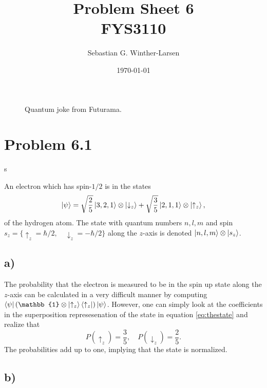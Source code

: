 \documentclass[]{article}
\title{Problem Sheet 6 \\
	\large{FYS3110}}
\author{Sebastian G. Winther-Larsen}
\date{\today}
\begin{document}
\maketitle


\begin{figure}[!htbp]
	\begin{minipage}[b]{0.5\textwidth}
	\end{minipage}
	\begin{minipage}[b]{0.5\textwidth}
	\end{minipage}
	\caption{Quantum joke from Futurama.}
\end{figure}

\section*{Problem 6.1}s

An electron which has spin-$1/2$ is in the states
\begin{equation}
\label{eq:thestate}
\ket{\psi} = \sqrt{\frac{2}{5}}\ket{3,2,1}\otimes\ket{\downarrow_z}+\sqrt{\frac{3}{5}}\ket{2,1,1}\otimes\ket{\uparrow_z},
\end{equation}
of the hydrogen atom. The state with quantum numbers $n,l,m$ and spin $s_z=\{\uparrow_z=\hbar/2, \quad \downarrow_z=-\hbar/2\}$ along the $z$-axis is denoted $\ket{n,l,m}\otimes\ket{s_z}$.

\subsection*{a)}
The probability that the electron is measured to be in the spin up state along the $z$-axis can be calculated in a very difficult manner by computing $\bra{\psi}(\mathbb{1}\otimes\ket{\uparrow_z}\bra{\uparrow_z}) \ket{\psi}$. However, one can simply look at the coefficients in the superposition represesenation of the state in equation \ref{eq:thestate} and realize that 
\begin{equation}
\label{eq:probupanddown}
P(\uparrow_z)=\frac{3}{5}, \quad P(\downarrow_z)=\frac{2}{5}.
\end{equation}
The probabilities add up to one, implying that the state is normalized.

\subsection*{b)}
\end{document}
